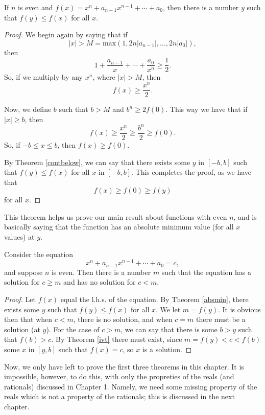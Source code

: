 \begin{theorem} \label{absmin}
If $n$ is even and $f(x) = x^n + a_{n-1}x^{n-1} + \cdots + a_0$, then there is a number $y$ such that $f(y) \le f(x)$ for all $x$.

\begin{proof}
We begin again by saying that if
\[ |x| > M = \textrm{max}(1, 2n|a_{n-1}|, \ldots, 2n|a_0|), \]
then
\[ 1 + \frac{a_{n-1}}{x} + \cdots + \frac{a_0}{x^n} \ge \frac{1}{2} .\]
So, if we multiply by any $x^n$, where $|x| > M$, then
\[ f(x) \ge \frac{x^n}{2}. \]

Now, we define $b$ such that $b > M$ and $b^n \ge 2f(0)$. This way we have that if $|x| \ge b$, then
\[ f(x) \ge \frac{x^n}{2} \ge \frac{b^n}{2} \ge f(0) .\]
So, if $-b \le x \le b$, then $f(x) \ge f(0)$.

By Theorem \ref{contbelow}, we can say that there exists some $y$ in $[-b, b]$ such that $f(y) \le f(x)$ for all $x$ in $[-b, b]$. This completes the proof, as we have that
\[ f(x) \ge f(0) \ge f(y) \]
for all $x$.
\end{proof}

\begin{remark}
This theorem helps us prove our main result about functions with even $n$, and is basically saying that the function has an absolute minimum value (for all $x$ values) at $y$.
\end{remark}
\end{theorem}

\begin{theorem}
Consider the equation 
\[ x^n + a_{n-1}x^{n-1} + \cdots + a_0 = c, \]
and suppose $n$ is even. Then there is  a number $m$ such that the equation has a solution for $c \ge m$ and has no solution for $c < m$.

\begin{proof}
Let $f(x)$ equal the l.h.s. of the equation. By Theorem \ref{absmin}, there exists some $y$ such that $f(y) \le f(x)$ for all $x$. We let $m = f(y)$. It is obvious then that when $c < m$, there is no solution, and when $c = m$ there must be a solution (at $y$). For the case of $c > m$, we can say that there is some $b > y$ such that $f(b) > c$. By Theorem \ref{ivt} there must exist, since $m = f(y) < c < f(b)$ some $x$ in $[y, b]$ such that $f(x) = c$, so $x$ is a solution.
\end{proof}
\end{theorem}

Now, we only have left to prove the first three theorems in this chapter. It is impossible, however, to do this, with only the propreties of the reals (and rationals) discussed in Chapter 1. Namely, we need some missing property of the reals which is not a property of the rationals; this is discussed in the next chapter.

